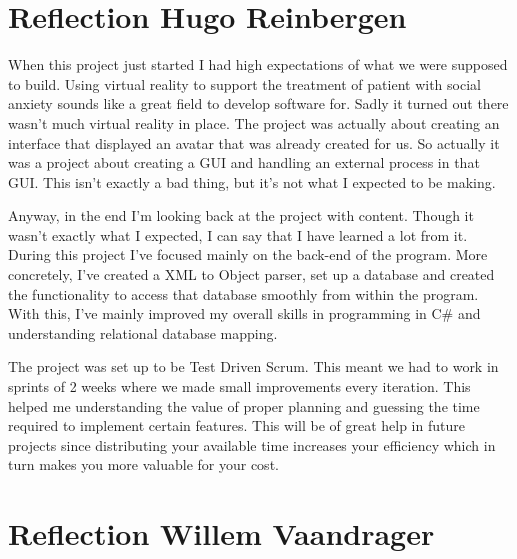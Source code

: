 \section{Reflection Hugo Reinbergen}
When this project just started I had high expectations of what we were supposed to build. Using virtual reality to support the treatment of patient with social anxiety sounds like a great field to develop software for. Sadly it turned out there wasn't much virtual reality in place. The project was actually about creating an interface that displayed an avatar that was already created for us. So actually it was a project about creating a GUI and handling an external process in that GUI. This isn't exactly a bad thing, but it's not what I expected to be making.

Anyway, in the end I'm looking back at the project with content. Though it wasn't exactly what I expected, I can say that I have learned a lot from it. During this project I've focused mainly on the back-end of the program. More concretely, I've created a XML to Object parser, set up a database and created the functionality to access that database smoothly from within the program. With this, I've mainly improved my overall skills in programming in C\# and understanding relational database mapping. 

The project was set up to be Test Driven Scrum. This meant we had to work in sprints of 2 weeks where we made small improvements every iteration. This helped me understanding the value of proper planning and guessing the time required to implement certain features. This will be of great help in future projects since distributing your available time increases your efficiency which in turn makes you more valuable for your cost.

\section{Reflection Willem Vaandrager}

